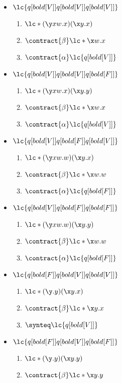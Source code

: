 \begin{itemize}
\item \(\lc{q[bold[V]] q[bold[V]] q[bold[V]]}\)
  \begin{enumerate}
  \item \(\lc*{(\y x w.x)(\x y.x)}\)
  \item \(\contract{\beta} \lc*{\x w.x}\)
  \item \(\contract{\alpha} \lc{q[bold[V]]}\)
  \end{enumerate}
\item \(\lc{q[bold[V]] q[bold[V]] q[bold[F]]}\)
  \begin{enumerate}
  \item \(\lc*{(\y x w.x)(\x y.y)}\)
  \item \(\contract{\beta} \lc*{\x w.x}\)
  \item \(\contract{\alpha} \lc{q[bold[V]]}\)
  \end{enumerate}
\item \(\lc{q[bold[V]] q[bold[F]] q[bold[V]]}\)
  \begin{enumerate}
  \item \(\lc*{(\y x w.w)(\x y.x)}\)
  \item \(\contract{\beta} \lc*{\x w.w}\)
  \item \(\contract{\alpha} \lc{q[bold[F]]}\)
  \end{enumerate}
\item \(\lc{q[bold[V]] q[bold[F]] q[bold[F]]}\)
  \begin{enumerate}
  \item \(\lc*{(\y x w.w)(\x y.y)}\)
  \item \(\contract{\beta} \lc*{\x w.w}\)
  \item \(\contract{\alpha} \lc{q[bold[F]]}\)
  \end{enumerate}
\item \(\lc{q[bold[F]] q[bold[V]] q[bold[V]]}\)
  \begin{enumerate}
  \item \(\lc*{(\y.y)(\x y. x)}\)
  \item \(\contract{\beta} \lc*{\x y.x}\)
  \item \(\synteq \lc{q[bold[V]]}\)
  \end{enumerate}
\item \(\lc{q[bold[F]] q[bold[V]] q[bold[F]]}\)
  \begin{enumerate}
  \item \(\lc*{(\y.y)(\x y.y)}\)
  \item \(\contract{\beta} \lc*{\x y.y}\)

\end{enumerate}
\end{itemize}

